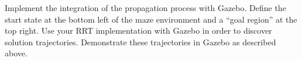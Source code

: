 \question{[20]}

Implement the integration of the propagation process with Gazebo. Define the
start state at the bottom left of the maze environment and a ``goal region''
at the top right. Use your RRT implementation with Gazebo in order to
discover solution trajectories. Demonstrate these trajectories in Gazebo
as described above.